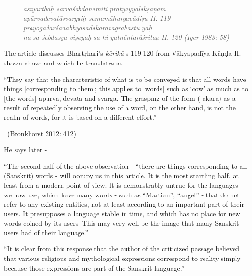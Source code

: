 \begin{verse}
\textit{astyarthaḥ sarvaśabdānāmiti pratyāyyalakṣaṇam }\\\textit{apūrvadevatāsvargaiḥ samamāhurgavādiṣu  II. 119\\\textit{prayogadarśanābhyāsādākārāvagrahastu yaḥ }\\\textit{na sa śabdasya viṣayaḥ sa hi yatnāntarāśritaḥ } II. 120 (Iyer 1983: 58)}
\end{verse}

The article discusses Bhartṛhari’s \textit{kārikā}-s 119-120 from Vākyapadīya Kāṇḍa II. shown above and which he translates as -

\begin{myquote}
“They say that the characteristic of what is to be conveyed is that all words have things [corresponding to them]; this applies to [words] such as ‘cow’ as much as to [the words] apūrva, devatā and svarga. The grasping of the form ( ākāra) as a result of repeatedly observing the use of a word, on the other hand, is not the realm of words, for it is based on a different effort.” 
\end{myquote}

\vspace{-.3cm}

\begin{myquote}

~\hfill (Bronkhorst 2012: 412)
\end{myquote}

He says later -

\begin{myquote}
“The second half of the above observation - “there are things corresponding to all (Sanskrit) words - will occupy us in this article. It is the most startling half, at least from a modern point of view. It is demonstrably untrue for the languages we now use, which have many words - such as “Martian”, “angel” - that do not refer to any existing entities, not at least according to an important part of their users. It presupposes a language stable in time, and which has no place for new words coined by its users. This may very well be the image that many Sanskrit users had of their language.”
\end{myquote}

\begin{myquote}
“It is clear from this response that the author of the criticized passage believed that various religious and mythological expressions correspond to reality simply because those expressions are part of the Sanskrit language.”
\end{myquote}

